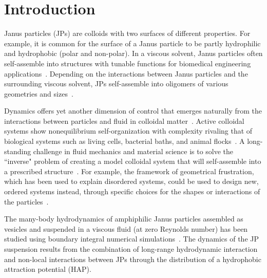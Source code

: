 \documentclass[prb,preprint,showpacs,preprintnumbers,amsmath,amssymb,longbibliography]{revtex4-1}
\begin{document}
\section{Introduction}
Janus particles (JPs) are colloids with two surfaces of different
properties. For example, it is common for the surface of a Janus
particle to be partly hydrophilic and hydrophobic (polar and non-polar).
In a viscous solvent, Janus particles often self-assemble into
structures with tunable functions for biomedical engineering
applications~\cite{GheisariSahfieeAbbasiEtAl2021_DMR,
LiuYangHuangEtAl2016_Angew, LiWangYaoEtAl2019_Nanoscale, Bradley2016}.
Depending on the interactions between Janus particles and the
surrounding viscous solvent, JPs self-assemble into oligomers of various
geometries and sizes~\cite{Bradley2017}. 

Dynamics offers yet another dimension of control that emerges naturally
from the interactions between particles and fluid in colloidal
matter~\cite{Brandner2019,RevModPhys.93.025008}. Active colloidal
systems show nonequilibrium self-organization with complexity rivaling
that of biological systems such as living cells, bacterial baths, and
animal flocks~\cite{CollardGrosjeanVandewalle2020,Vutukuri2020}. A
long-standing challenge in fluid mechanics and material science is to
solve the ``inverse" problem of creating a model colloidal system that
will self-assemble into a prescribed
structure~\cite{PhysRevLett.128.256102}. For example, the framework of
geometrical frustration, which has been used to explain disordered
systems, could be used to design new, ordered systems instead, through
specific choices for the shapes or interactions of the
particles~\cite{Manoharan2015_Science}.

The many-body hydrodynamics of amphiphilic Janus particles assembled as
vesicles and suspended in a viscous fluid (at zero Reynolds number) has
been studied using boundary integral numerical
simulations~\cite{Fu20,Fu2022_JFM}. The dynamics of the JP suspension
results from the combination of long-range hydrodynamic interaction and
non-local interactions between JPs through the distribution of a
hydrophobic attraction potential (HAP).
\end{document}
